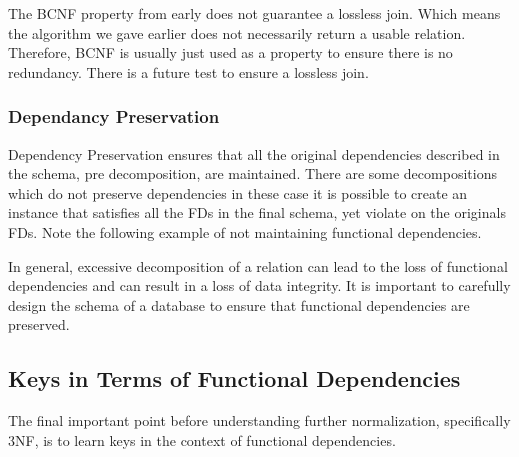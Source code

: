 \documentclass{report}
\begin{document}
The BCNF property from early does not guarantee a lossless join. Which means the algorithm we gave earlier does not necessarily return a usable relation. Therefore, BCNF is usually just used as a property to ensure there is no redundancy. There is a future test to ensure a lossless join.

\subsubsection{Dependancy Preservation}

Dependency Preservation ensures that all the original dependencies described in the schema, pre decomposition, are maintained. There are some decompositions which do not preserve dependencies in these case it is possible to create an instance that satisfies all the FDs in the final schema, yet violate on the originals FDs. Note the following example of not maintaining functional dependencies. 
\vspace{.5cm}
 
\vspace{.5cm}
In general, excessive decomposition of a relation can lead to the loss of functional dependencies and can result in a loss of data integrity. It is important to carefully design the schema of a database to ensure that functional dependencies are preserved.


\subsection{Keys in Terms of Functional Dependencies}

The final important point before understanding further normalization, specifically 3NF, is to learn keys in the context of functional dependencies.
\end{document}
